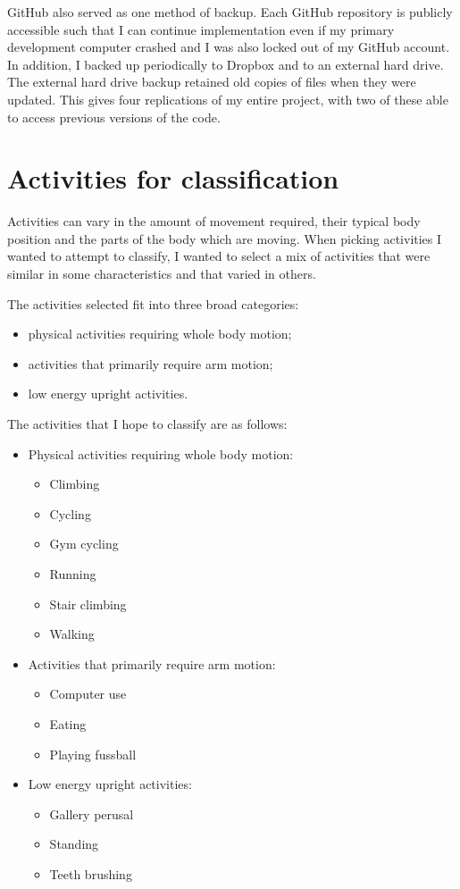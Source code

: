       GitHub also served as one method of backup. Each GitHub repository is publicly accessible such that I can continue implementation even if my primary development computer crashed and I was also locked out of my GitHub account. In addition, I backed up periodically to Dropbox and to an external hard drive. The external hard drive backup retained old copies of files when they were updated. This gives four replications of my entire project, with two of these able to access previous versions of the code.
  \section{Activities for classification}
    \label{sec:activities_for_classification}
    Activities can vary in the amount of movement required, their typical body position and the parts of the body which are moving. When picking activities I wanted to attempt to classify, I wanted to select a mix of activities that were similar in some characteristics and that varied in others.
    
    The activities selected fit into three broad categories:
    \begin{itemize}
      \item physical activities requiring whole body motion;
      \item activities that primarily require arm motion;
      \item low energy upright activities.
    \end{itemize}
    
    The activities that I hope to classify are as follows:
    \begin{itemize}
      \item Physical activities requiring whole body motion:
      \begin{itemize}
        \item Climbing
        \item Cycling
        \item Gym cycling
        \item Running
        \item Stair climbing
        \item Walking
      \end{itemize} 
      \item Activities that primarily require arm motion:
      \begin{itemize}
        \item Computer use
        \item Eating
        \item Playing fussball
      \end{itemize}
      \item Low energy upright activities:
      \begin{itemize}
        \item Gallery perusal
        \item Standing
        \item Teeth brushing
      \end{itemize}
    \end{itemize}
    

